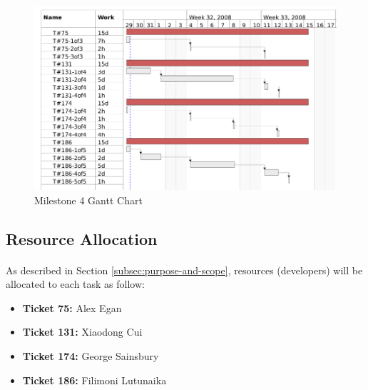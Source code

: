 \documentclass[10pt,a4,oneside]{article}
\begin{document}
 
\begin{figure}[h!]
\begin{centering}
\includegraphics[width=150mm]{figs/m4gantt}
\end{centering}
\caption{Milestone 4 Gantt Chart}
\label{fig:m4gantt}
\end{figure}

\newpage

\subsection{Resource Allocation}
 
\paragraph{}
As described in Section \ref{subsec:purpose-and-scope}, resources (developers) will be allocated to 
each task as follow:
 
\begin{itemize}
  
\item \textbf{Ticket 75:} Alex Egan \\

\item \textbf{Ticket 131:} Xiaodong Cui \\ 
 
\item \textbf{Ticket 174:} George Sainsbury \\
 
\item \textbf{Ticket 186:} Filimoni Lutunaika \\
 
\end{itemize}
 
\end{document}
